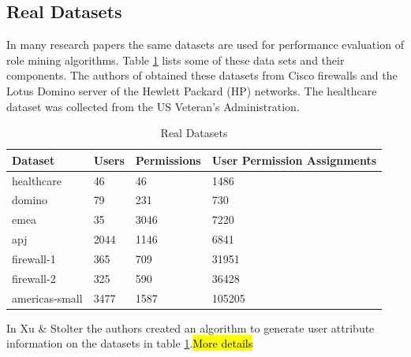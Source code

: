 \subsection{Real Datasets}
In many research papers the same datasets are used for performance evaluation of role mining algorithms. Table \ref{tab:realDatasets} lists some of these data sets and their components. The authors of \cite{Ene} obtained these datasets from Cisco firewalls and the Lotus Domino server of the Hewlett Packard (HP) networks. The healthcare dataset was collected from the US Veteran’s Administration.
\begin{table}
    \centering
    \begin{tabular}{|l|l|l|l|}
        \hline
        \rowcolor{myGray} 
        \textbf{Dataset} & \textbf{Users} & \textbf{Permissions} & \textbf{User Permission Assignments} \\ \hline
        healthcare       & 46             & 46                   & 1486                                 \\ \hline
        domino           & 79             & 231                  & 730                                  \\ \hline
        emea             & 35             & 3046                 & 7220                                 \\ \hline
        apj              & 2044           & 1146                 & 6841                                 \\ \hline
        firewall-1       & 365            & 709                  & 31951                                \\ \hline
        firewall-2       & 325            & 590                  & 36428                                \\ \hline
        americas-small   & 3477           & 1587                 & 105205                               \\ \hline
    \end{tabular}
    \caption{Real Datasets}
    \label{tab:realDatasets}
\end{table}
In Xu \& Stolter\cite{Xu} the authors created an algorithm to generate user attribute information on the datasets in table \ref{tab:realDatasets}.\hl{More details}

